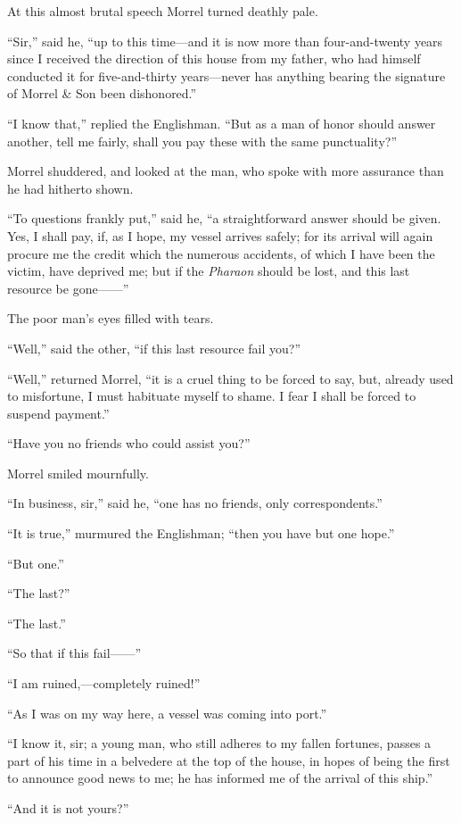 At this almost brutal speech Morrel turned deathly pale.

“Sir,” said he, “up to this time—and it is now more than
four-and-twenty years since I received the direction of this house from
my father, who had himself conducted it for five-and-thirty years—never
has anything bearing the signature of Morrel \& Son been dishonored.”

“I know that,” replied the Englishman. “But as a man of honor should
answer another, tell me fairly, shall you pay these with the same
punctuality?”

Morrel shuddered, and looked at the man, who spoke with more assurance
than he had hitherto shown.

“To questions frankly put,” said he, “a straightforward answer should
be given. Yes, I shall pay, if, as I hope, my vessel arrives safely;
for its arrival will again procure me the credit which the numerous
accidents, of which I have been the victim, have deprived me; but if
the \textit{Pharaon} should be lost, and this last resource be gone——”

The poor man’s eyes filled with tears.

“Well,” said the other, “if this last resource fail you?”

“Well,” returned Morrel, “it is a cruel thing to be forced to say, but,
already used to misfortune, I must habituate myself to shame. I fear I
shall be forced to suspend payment.”

“Have you no friends who could assist you?”

Morrel smiled mournfully.

“In business, sir,” said he, “one has no friends, only correspondents.”

“It is true,” murmured the Englishman; “then you have but one hope.”

“But one.”

“The last?”

“The last.”

“So that if this fail——”

“I am ruined,—completely ruined!”

“As I was on my way here, a vessel was coming into port.”

“I know it, sir; a young man, who still adheres to my fallen fortunes,
passes a part of his time in a belvedere at the top of the house, in
hopes of being the first to announce good news to me; he has informed
me of the arrival of this ship.”

“And it is not yours?”

